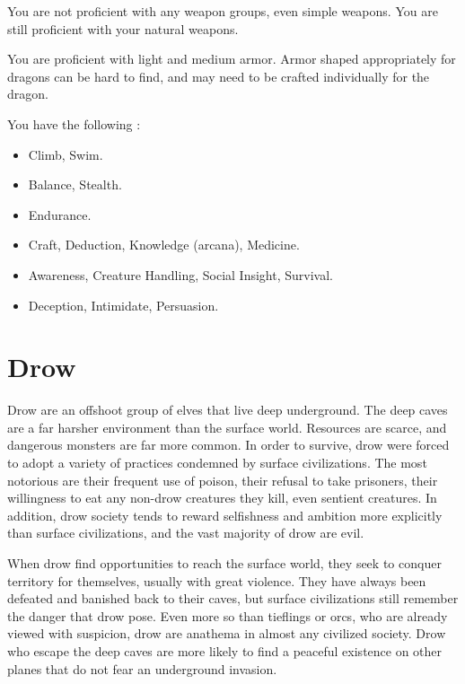         You are not proficient with any weapon groups, even simple weapons.
        You are still proficient with your natural weapons.

        You are proficient with light and medium armor.
        Armor shaped appropriately for dragons can be hard to find, and may need to be crafted individually for the dragon.

        You have the following :
        \begin{itemize}
            \item {} Climb, Swim.
            \item {} Balance, Stealth.
            \item {} Endurance.
            \item {} Craft, Deduction, Knowledge (arcana), Medicine.
            \item {} Awareness, Creature Handling, Social Insight, Survival.
            \item {} Deception, Intimidate, Persuasion.
        \end{itemize}

\section{Drow}

    Drow are an offshoot group of elves that live deep underground.
    The deep caves are a far harsher environment than the surface world.
    Resources are scarce, and dangerous monsters are far more common.
    In order to survive, drow were forced to adopt a variety of practices condemned by surface civilizations.
    The most notorious are their frequent use of poison, their refusal to take prisoners, their willingness to eat any non-drow creatures they kill, even sentient creatures.
    In addition, drow society tends to reward selfishness and ambition more explicitly than surface civilizations, and the vast majority of drow are evil.

    When drow find opportunities to reach the surface world, they seek to conquer territory for themselves, usually with great violence.
    They have always been defeated and banished back to their caves, but surface civilizations still remember the danger that drow pose.
    Even more so than tieflings or orcs, who are already viewed with suspicion, drow are anathema in almost any civilized society.
    Drow who escape the deep caves are more likely to find a peaceful existence on other planes that do not fear an underground invasion.


